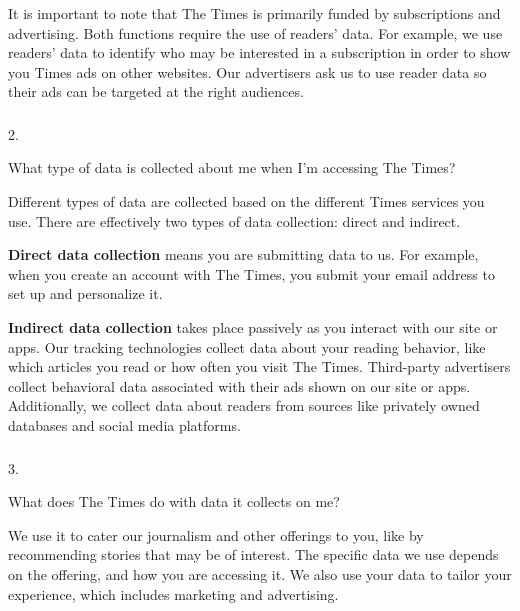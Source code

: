 It is important to note that The Times is primarily funded by
subscriptions and advertising. Both functions require the use of
readers' data. For example, we use readers' data to identify who may be
interested in a subscription in order to show you Times ads on other
websites. Our advertisers ask us to use reader data so their ads can be
targeted at the right audiences.

\hypertarget{-1}{%
\subsubsection{}\label{-1}}

2.

What type of data is collected about me when I'm accessing The Times?

Different types of data are collected based on the different Times
services you use. There are effectively two types of data collection:
direct and indirect.

\textbf{Direct data collection} means you are submitting data to us. For
example, when you create an account with The Times, you submit your
email address to set up and personalize it.

\textbf{Indirect data collection} takes place passively as you interact
with our site or apps. Our tracking technologies collect data about your
reading behavior, like which articles you read or how often you visit
The Times. Third-party advertisers collect behavioral data associated
with their ads shown on our site or apps. Additionally, we collect data
about readers from sources like privately owned databases and social
media platforms.

\hypertarget{-2}{%
\subsubsection{}\label{-2}}

3.

What does The Times do with data it collects on me?

We use it to cater our journalism and other offerings to you, like by
recommending stories that may be of interest. The specific data we use
depends on the offering, and how you are accessing it. We also use your
data to tailor your experience, which includes marketing and
advertising.

\hypertarget{-3}{%
\subsubsection{}\label{-3}}

